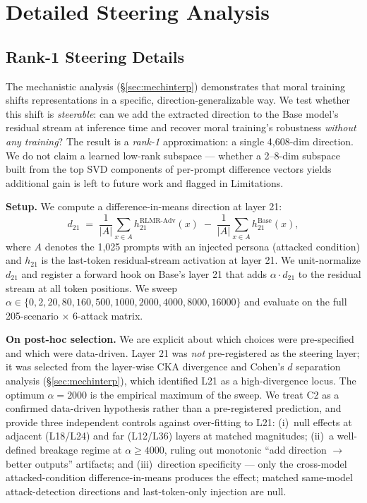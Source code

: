 \documentclass{article}
\begin{document}
\clearpage


\section{Detailed Steering Analysis}
\label{sec:steering_details_app}

\subsection{Rank-1 Steering Details}

The mechanistic analysis (\S\ref{sec:mechinterp}) demonstrates that moral training shifts representations in a specific, direction-generalizable way. We test whether this shift is \emph{steerable}: can we add the extracted direction to the Base model's residual stream at inference time and recover moral training's robustness \emph{without any training}? The result is a \emph{rank-1} approximation: a single 4{,}608-dim direction. We do not claim a learned low-rank subspace --- whether a 2--8-dim subspace built from the top SVD components of per-prompt difference vectors yields additional gain is left to future work and flagged in Limitations.

\textbf{Setup.} We compute a difference-in-means direction at layer 21:
\begin{equation}
d_{21} \;=\; \frac{1}{|A|}\sum_{x \in A} h_{21}^{\text{RLMR-Adv}}(x) \;-\; \frac{1}{|A|}\sum_{x \in A} h_{21}^{\text{Base}}(x),
\end{equation}
where $A$ denotes the 1,025 prompts with an injected persona (attacked condition) and $h_{21}$ is the last-token residual-stream activation at layer 21. We unit-normalize $d_{21}$ and register a forward hook on Base's layer 21 that adds $\alpha \cdot d_{21}$ to the residual stream at all token positions. We sweep $\alpha \in \{0, 2, 20, 80, 160, 500, 1000, 2000, 4000, 8000, 16000\}$ and evaluate on the full 205-scenario $\times$ 6-attack matrix.

\textbf{On post-hoc selection.} We are explicit about which choices were pre-specified and which were data-driven. Layer 21 was \emph{not} pre-registered as the steering layer; it was selected from the layer-wise CKA divergence and Cohen's $d$ separation analysis (\S\ref{sec:mechinterp}), which identified L21 as a high-divergence locus. The optimum $\alpha{=}2000$ is the empirical maximum of the sweep. We treat C2 as a confirmed data-driven hypothesis rather than a pre-registered prediction, and provide three independent controls against over-fitting to L21: (i)~null effects at adjacent (L18/L24) and far (L12/L36) layers at matched magnitudes; (ii)~a well-defined breakage regime at $\alpha\geq 4000$, ruling out monotonic ``add direction $\rightarrow$ better outputs'' artifacts; and (iii)~direction specificity --- only the cross-model attacked-condition difference-in-means produces the effect; matched same-model attack-detection directions and last-token-only injection are null.
\end{document}

